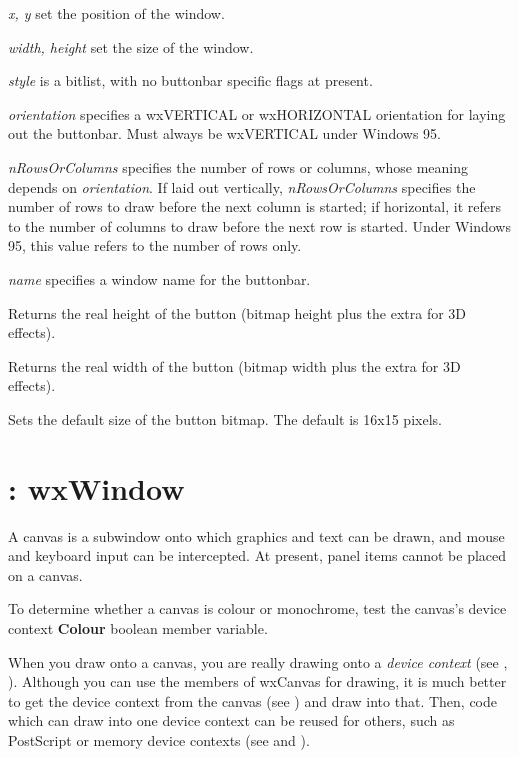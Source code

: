 {\it x, y} set the position of the window.

{\it width, height} set the size of the window.

{\it style} is a bitlist, with no buttonbar specific flags at present.

{\it orientation} specifies a wxVERTICAL or wxHORIZONTAL orientation for laying out
the buttonbar. Must always be wxVERTICAL under Windows 95.

{\it nRowsOrColumns} specifies the number of rows or
columns, whose meaning depends on {\it orientation}.  If laid out
vertically, {\it nRowsOrColumns} specifies the number of rows to draw
before the next column is started; if horizontal, it refers to the
number of columns to draw before the next row is started.
Under Windows 95, this value refers to the number of rows only.

{\it name} specifies a window name for the buttonbar.



Returns the real height of the button (bitmap height plus the extra for
3D effects).



Returns the real width of the button (bitmap width plus the extra for
3D effects).



Sets the default size of the button bitmap. The default is 16x15 pixels.

\section{: wxWindow}\label{wxcanvas}

A canvas is a subwindow onto which graphics and text can be drawn, and
mouse and keyboard input can be intercepted.  At present, panel items
cannot be placed on a canvas.

To determine whether a canvas is colour or monochrome, test the canvas's
device context {\bf Colour} boolean member variable.

When you draw onto a canvas, you are really drawing onto a {\it device
context} (see , ).
Although you can use the members of wxCanvas for drawing,
it is much better to get the device context from the canvas
(see ) and draw into that. Then,
code which can draw into one device context can be reused for others,
such as PostScript or memory device contexts (see \rtfsp
and ).

